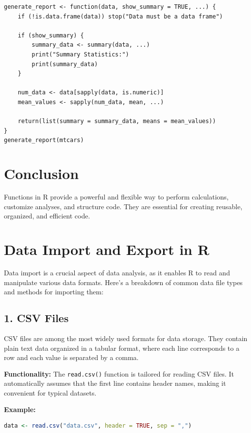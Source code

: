 \documentclass[10pt]{book}
\begin{document}
\begin{lstlisting}
generate_report <- function(data, show_summary = TRUE, ...) {
    if (!is.data.frame(data)) stop("Data must be a data frame")
    
    if (show_summary) {
        summary_data <- summary(data, ...)
        print("Summary Statistics:")
        print(summary_data)
    }
    
    num_data <- data[sapply(data, is.numeric)]
    mean_values <- sapply(num_data, mean, ...)
    
    return(list(summary = summary_data, means = mean_values))
}
generate_report(mtcars)
\end{lstlisting}

\section{Conclusion}
Functions in R provide a powerful and flexible way to perform calculations, customize analyses, and structure code. They are essential for creating reusable, organized, and efficient code.









\section{Data Import and Export in R}
Data import is a crucial aspect of data analysis, as it enables R to read and manipulate various data formats. Here’s a breakdown of common data file types and methods for importing them:

\subsection{1. CSV Files}
CSV files are among the most widely used formats for data storage. They contain plain text data organized in a tabular format, where each line corresponds to a row and each value is separated by a comma.

\textbf{Functionality:} The \texttt{read.csv()} function is tailored for reading CSV files. It automatically assumes that the first line contains header names, making it convenient for typical datasets.

\textbf{Example:}
\begin{lstlisting}[language=R]
data <- read.csv("data.csv", header = TRUE, sep = ",")
\end{lstlisting}
\end{document}
